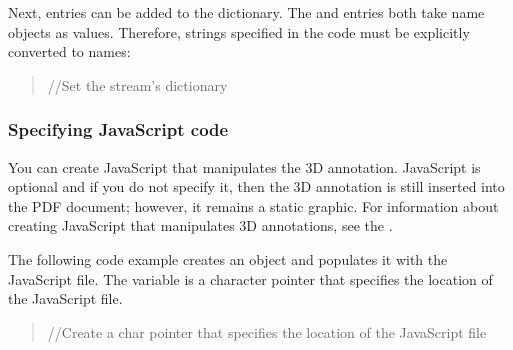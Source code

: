 \documentclass[letterpaper,12pt,english,openany,oneside]{sphinxmanual}
\begin{document}
Next, entries can be added to the dictionary. The  and  entries both take name objects as values. Therefore, strings specified in the code must be explicitly converted to names:
\begin{quote}

//Set the stream’s dictionary
\end{quote}

\begin{sphinxVerbatim}[commandchars=\\\{\}]
   
    
\end{sphinxVerbatim}


\subsubsection{Specifying JavaScript code}
\label{\detokenize{Plugins_3D_samples:specifying-javascript-code}}
You can create JavaScript that manipulates the 3D annotation. JavaScript is optional and if you do not specify it, then the 3D annotation is still inserted into the PDF document; however, it remains a static graphic. For information about creating JavaScript that manipulates 3D annotations, see the .

The following code example creates an  object and populates it with the JavaScript file. The  variable is a character pointer that specifies the location of the JavaScript file.
\begin{quote}

//Create a char pointer that specifies the location of the JavaScript file
\end{quote}

\begin{sphinxVerbatim}[commandchars=\\\{\}]
   


         
\end{sphinxVerbatim}
\end{document}
